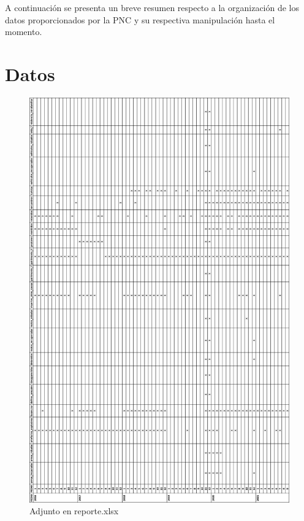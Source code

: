 





A continuación se presenta un breve resumen respecto a la organización de los datos proporcionados por la PNC y su respectiva manipulación hasta el momento. 

\section{Datos}
\begin{figure}
	\centering
	\includegraphics[scale=0.4]{Images/1}
	\caption{Adjunto en reporte.xlsx}
	\label{image:1}
\end{figure}

